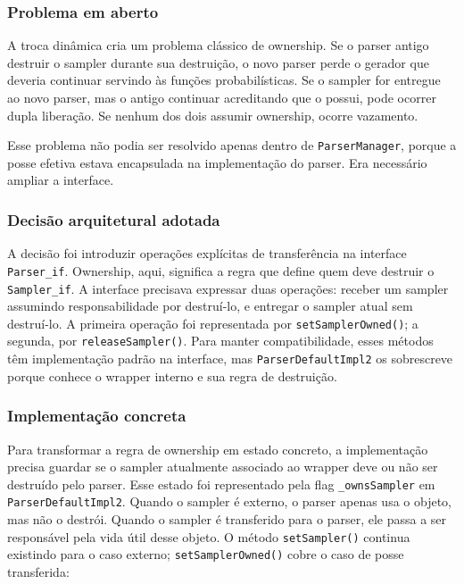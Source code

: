\documentclass[12pt,a4paper]{article}
\begin{document}
\subsubsection{Problema em aberto}

A troca din\^amica cria um problema cl\'assico de ownership. Se o parser antigo destruir o sampler durante sua destrui\c{c}\~ao, o novo parser perde o gerador que deveria continuar servindo \`as fun\c{c}\~oes probabil\'isticas. Se o sampler for entregue ao novo parser, mas o antigo continuar acreditando que o possui, pode ocorrer dupla libera\c{c}\~ao. Se nenhum dos dois assumir ownership, ocorre vazamento.

Esse problema n\~ao podia ser resolvido apenas dentro de \texttt{ParserManager}, porque a posse efetiva estava encapsulada na implementa\c{c}\~ao do parser. Era necess\'ario ampliar a interface.

\subsubsection{Decis\~ao arquitetural adotada}

A decis\~ao foi introduzir opera\c{c}\~oes expl\'icitas de transfer\^encia na interface \texttt{Parser\_if}. Ownership, aqui, significa a regra que define quem deve destruir o \texttt{Sampler\_if}. A interface precisava expressar duas opera\c{c}\~oes: receber um sampler assumindo responsabilidade por destru\'i-lo, e entregar o sampler atual sem destru\'i-lo. A primeira opera\c{c}\~ao foi representada por \texttt{setSamplerOwned()}; a segunda, por \texttt{releaseSampler()}. Para manter compatibilidade, esses m\'etodos t\^em implementa\c{c}\~ao padr\~ao na interface, mas \texttt{ParserDefaultImpl2} os sobrescreve porque conhece o wrapper interno e sua regra de destrui\c{c}\~ao.

\subsubsection{Implementa\c{c}\~ao concreta}

Para transformar a regra de ownership em estado concreto, a implementa\c{c}\~ao precisa guardar se o sampler atualmente associado ao wrapper deve ou n\~ao ser destru\'ido pelo parser. Esse estado foi representado pela flag \texttt{\_ownsSampler} em \texttt{ParserDefaultImpl2}. Quando o sampler \'e externo, o parser apenas usa o objeto, mas n\~ao o destr\'oi. Quando o sampler \'e transferido para o parser, ele passa a ser respons\'avel pela vida \'util desse objeto. O m\'etodo \texttt{setSampler()} continua existindo para o caso externo; \texttt{setSamplerOwned()} cobre o caso de posse transferida:
\end{document}
